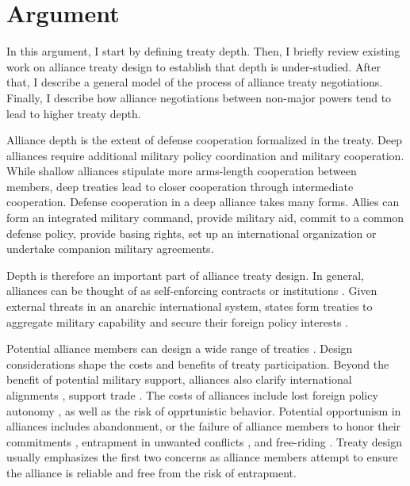 \documentclass[12pt]{article}
\begin{document}
\section{Argument}

In this argument, I start by defining treaty depth. 
Then, I briefly review existing work on alliance treaty design to establish that depth is under-studied. 
After that, I describe a general model of the process of alliance treaty negotiations. 
Finally, I describe how alliance negotiations between non-major powers tend to lead to higher treaty depth. 


Alliance depth is the extent of defense cooperation formalized in the treaty. 
Deep alliances require additional military policy coordination and military cooperation. 
While shallow alliances stipulate more arms-length cooperation between members, deep treaties lead to closer cooperation through intermediate cooperation. 
Defense cooperation in a deep alliance takes many forms. 
Allies can form an integrated military command, provide military aid, commit to a common defense policy, provide basing rights, set up an international organization or undertake companion military agreements. 


Depth is therefore an important part of alliance treaty design. 
In general, alliances can be thought of as self-enforcing contracts or institutions \citep{Leedsetal2002, Morrow2000}.
Given external threats in an anarchic international system, states form treaties to aggregate military capability and secure their foreign policy interests \citep{Altfield1984, Smith1995, Snyder1997, FordhamPoast2014}. 


Potential alliance members can design a wide range of treaties \citep{Leedsetal2000, Leedsetal2002, Benson2012, BensonClinton2016}. 
Design considerations shape the costs and benefits of treaty participation. 
Beyond the benefit of potential military support, alliances also clarify international alignments \citep{Snyder1990}, support trade \citep{Gowa1995, Long2003, Fordham2010, WolfordKim2017}. 
The costs of alliances include lost foreign policy autonomy \citep{Altfield1984, Morrow2000, Johnson2015}, as well as the risk of opprtunistic behavior. 
Potential opportunism in alliances includes abandonment, or the failure of alliance members to honor their commitments \citep{BerkemeierFuhrmann2018}, entrapment in unwanted conflicts \citep{Snyder1984}, and free-riding \citep{Morrow2000}.  
Treaty design usually emphasizes the first two concerns as alliance members attempt to ensure the alliance is reliable and free from the risk of entrapment. 
\end{document}
